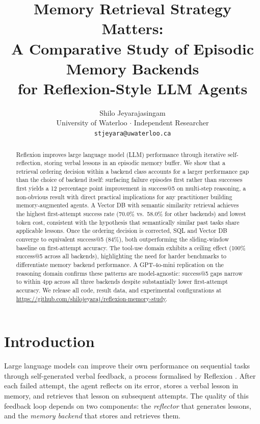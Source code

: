 \documentclass{article}
\title{Memory Retrieval Strategy Matters:\\
A Comparative Study of Episodic Memory Backends\\
for Reflexion-Style LLM Agents}
\author{
  Shilo Jeyarajasingam \\
  University of Waterloo $\cdot$ Independent Researcher \\
  \texttt{stjeyara@uwaterloo.ca}
}
\begin{document}
\maketitle

\begin{abstract}
Reflexion \citep{shinn2023reflexion} improves large language model (LLM)
performance through iterative self-reflection, storing verbal lessons in an
episodic memory buffer. We show that a retrieval ordering decision within a
backend class accounts for a larger performance gap than the choice of backend
itself: surfacing failure episodes first rather than successes first yields a
12 percentage point improvement in success@5 on multi-step reasoning, a
non-obvious result with direct practical implications for any practitioner
building memory-augmented agents. A Vector DB with semantic similarity
retrieval achieves the highest first-attempt success rate (70.0\% vs.\
58.0\% for other backends) and lowest token cost, consistent with the
hypothesis that semantically similar past tasks share applicable lessons.
Once the ordering decision is corrected, SQL and Vector DB converge to
equivalent success@5 (84\%), both outperforming the sliding-window baseline
on first-attempt accuracy. The tool-use domain exhibits a ceiling effect
(100\% success@5 across all backends), highlighting the need for harder
benchmarks to differentiate memory backend performance. A GPT-4o-mini
replication on the reasoning domain confirms these patterns are
model-agnostic: success@5 gaps narrow to within 4pp across all three
backends despite substantially lower first-attempt accuracy. We release
all code, result data, and experimental configurations at
\url{https://github.com/shilojeyaraj/reflexion-memory-study}.
\end{abstract}

\section{Introduction}
\label{sec:intro}

Large language models can improve their own performance on sequential tasks
through self-generated verbal feedback, a process formalised by Reflexion
\citep{shinn2023reflexion}. After each failed attempt, the agent reflects on
its error, stores a verbal lesson in memory, and retrieves that lesson on
subsequent attempts. The quality of this feedback loop depends on two
components: the \emph{reflector} that generates lessons, and the
\emph{memory backend} that stores and retrieves them.
\end{document}
